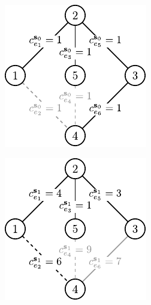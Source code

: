 \begin{figure}[!htbp]
	\null\hfill
	\ContinuedFloat
	\begin{subfigure}[b]{0.3\textwidth}
		\includegraphics[width=\textwidth]{Chapter_II/ROB-INC-MST-example/a2}
		\caption{}
		\label{fig:robincrexample:d}
	\end{subfigure}
	\hfill
	\begin{subfigure}[b]{0.3\textwidth}
		\includegraphics[width=\textwidth]{Chapter_II/ROB-INC-MST-example/b2}

\end{subfigure}
\end{figure}
